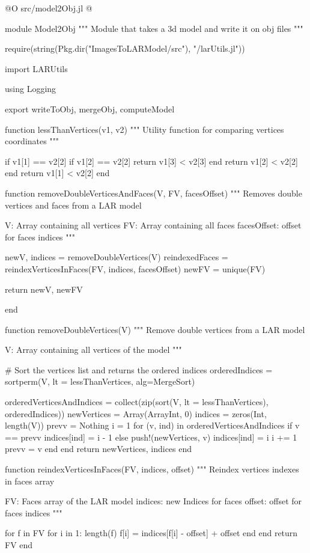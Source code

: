 \documentclass[11pt,oneside]{article}	%
\begin{document}
@O src/model2Obj.jl
@{module Model2Obj
"""
Module that takes a 3d model and write it on
obj files
"""

require(string(Pkg.dir("ImagesToLARModel/src"), "/larUtils.jl"))

import LARUtils

using Logging

export writeToObj, mergeObj, computeModel


function lessThanVertices(v1, v2)
  """
  Utility function for comparing vertices coordinates
  """

  if v1[1] == v2[2]
    if v1[2] == v2[2]
      return v1[3] < v2[3]
    end
    return v1[2] < v2[2]
  end
  return v1[1] < v2[2]
end

function removeDoubleVerticesAndFaces(V, FV, facesOffset)
  """
  Removes double vertices and faces from a LAR model

  V: Array containing all vertices
  FV: Array containing all faces
  facesOffset: offset for faces indices
  """

  newV, indices = removeDoubleVertices(V)
  reindexedFaces = reindexVerticesInFaces(FV, indices, facesOffset)
  newFV = unique(FV)

  return newV, newFV

end

function removeDoubleVertices(V)
  """
  Remove double vertices from a LAR model

  V: Array containing all vertices of the model
  """

  # Sort the vertices list and returns the ordered indices
  orderedIndices = sortperm(V, lt = lessThanVertices, alg=MergeSort)

  orderedVerticesAndIndices = collect(zip(sort(V, lt = lessThanVertices),
                                          orderedIndices))
  newVertices = Array(Array{Int}, 0)
  indices = zeros(Int, length(V))
  prevv = Nothing
  i = 1
  for (v, ind) in orderedVerticesAndIndices
    if v == prevv
      indices[ind] = i - 1
    else
      push!(newVertices, v)
      indices[ind] = i
      i += 1
      prevv = v
    end
  end
  return newVertices, indices
end

function reindexVerticesInFaces(FV, indices, offset)
  """
  Reindex vertices indexes in faces array

  FV: Faces array of the LAR model
  indices: new Indices for faces
  offset: offset for faces indices
  """

  for f in FV
    for i in 1: length(f)
      f[i] = indices[f[i] - offset] + offset
    end
  end
  return FV
end

}
\end{document}
